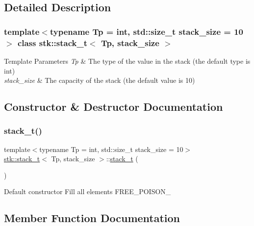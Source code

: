\subsection{Detailed Description}
\subsubsection*{template$<$typename Tp = int, std\+::size\+\_\+t stack\+\_\+size = 10$>$\newline
class stk\+::stack\+\_\+t$<$ Tp, stack\+\_\+size $>$}


\begin{DoxyTemplParams}{Template Parameters}
{\em Tp} & The type of the value in the stack (the default type is int) \\
\hline
{\em stack\+\_\+size} & The capacity of the stack (the default value is 10) \\
\hline
\end{DoxyTemplParams}


\subsection{Constructor \& Destructor Documentation}
\mbox{\label{classstk_1_1stack__t_ab7605ffb3efbfdaf23c1411dba8076d7}} 
\subsubsection{\texorpdfstring{stack\+\_\+t()}{stack\_t()}}
{\footnotesize\ttfamily template$<$typename Tp  = int, std\+::size\+\_\+t stack\+\_\+size = 10$>$ \\
\hyperlink{classstk_1_1stack__t}{stk\+::stack\+\_\+t}$<$ Tp, stack\+\_\+size $>$\+::\hyperlink{classstk_1_1stack__t}{stack\+\_\+t} (\begin{DoxyParamCaption}{ }\end{DoxyParamCaption})\hspace{0.3cm}{\ttfamily [inline]}}

Default constructor Fill all elements F\+R\+E\+E\+\_\+\+P\+O\+I\+S\+O\+N\+\_\+ 

\subsection{Member Function Documentation}
\mbox{\label{classstk_1_1stack__t_a558f4d8b04d74c04392e47e86723a113}} 
